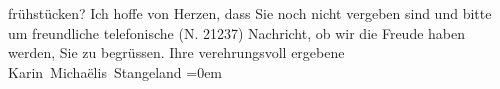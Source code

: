 \begin{ledgroupsized}[t]{13cm}
               frühstücken?\pend
           \pstart
           {\pb}Ich hoffe von Herzen, dass Sie noch nicht vergeben sind
               und bitte um freundliche telefonische (N. 21237)  Nachricht, ob wir die Freude haben werden, Sie zu
               begrüssen.\pend
           \pstart
           Ihre verehrungsvoll ergebene{\\[\baselineskip]}\spacefill\mbox{Karin Michaëlis
               Stangeland}\pend
           \leftskip=0em{}\endnumbering{}\end{ledgroupsized}  \newcommand{\dateiname}{L02582}\newcommand{\titel}{Karin Michaëlis an Arthur Schnitzler, 21. 10. 1912}\newcommand{\editorInnen}{Martin Anton Müller und Laura Untner}
      